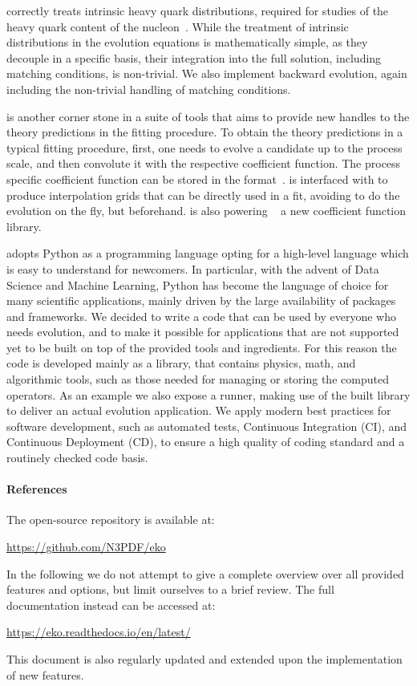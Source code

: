 \eko{} correctly treats intrinsic heavy quark distributions,
required for studies of the heavy quark content of the nucleon~\cite{Ball:2022qks}.
While the treatment of intrinsic distributions in the evolution equations is
mathematically simple, as they decouple in a specific basis, their integration
into the full solution, including matching conditions, is non-trivial.
We also implement backward evolution, again including the non-trivial
handling of matching conditions.

\eko{} is another corner stone in a suite of tools that aims to
provide new handles to the theory predictions in the \pdf{} fitting
procedure. To obtain the theory predictions in a typical fitting procedure,
first, one needs to evolve a candidate \pdf{} up to the process scale,
and then convolute it with the respective coefficient function.
The process specific coefficient function can be stored in the
\pineappl{} format~\cite{Carrazza_2020,christopher_schwan_2022_5846421}.
\eko{} is interfaced with \pineappl{} to produce
interpolation grids that can be directly used in a \pdf{} fit,
avoiding to do the evolution on the fly, but beforehand.
\eko{} is also powering \yadism{}~\cite{yadism} a new \dis{}
coefficient function library.

\eko{} adopts Python as a programming language opting for a high-level language
which is easy to understand for newcomers.
In particular, with the advent of Data Science and Machine Learning, Python has
become the language of choice for many scientific applications, mainly driven
by the large availability of packages and frameworks.
We decided to write a code that can be used by everyone who needs \qcd{}
evolution, and to make it possible for applications that are not supported yet
to be built on top of the provided tools and ingredients.
For this reason the code is developed mainly as a library, that contains
physics, math, and algorithmic tools, such as those needed for managing or
storing the computed operators. As an example we also expose a runner, making
use of the built library to deliver an actual evolution application. 
We apply modern best practices for software development, such as automated
tests, Continuous Integration (CI), and Continuous Deployment (CD), to ensure a
high quality of coding standard and a routinely checked code basis.

\paragraph{References} The open-source repository is available at:
\begin{center}
\url{https://github.com/N3PDF/eko}
\end{center}
In the following we do not attempt to give a complete overview over all
provided features and options, but limit ourselves to a brief review. The
full documentation instead can be accessed at:
\begin{center}
\url{https://eko.readthedocs.io/en/latest/}
\end{center}
This document is also regularly updated and extended upon the
implementation of new features.
